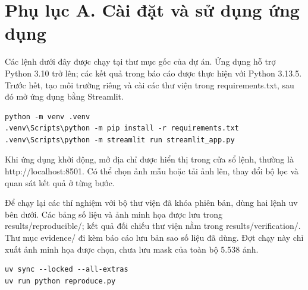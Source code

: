 \documentclass[12pt,a4paper]{extreport}
\begin{document}
\section*{Phụ lục A. Cài đặt và sử dụng ứng dụng}
Các lệnh dưới đây được chạy tại thư mục gốc của dự án. Ứng dụng hỗ trợ Python 3.10 trở lên; các kết quả trong báo cáo được thực hiện với Python 3.13.5. Trước hết, tạo môi trường riêng và cài các thư viện trong requirements.txt, sau đó mở ứng dụng bằng Streamlit.
\par
\begin{Verbatim}[fontsize=\fontsize{9}{10.3}\selectfont]
python -m venv .venv
.venv\Scripts\python -m pip install -r requirements.txt
.venv\Scripts\python -m streamlit run streamlit_app.py
\end{Verbatim}
Khi ứng dụng khởi động, mở địa chỉ được hiển thị trong cửa sổ lệnh, thường là http://localhost:8501. Có thể chọn ảnh mẫu hoặc tải ảnh lên, thay đổi bộ lọc và quan sát kết quả ở từng bước.
\par
Để chạy lại các thí nghiệm với bộ thư viện đã khóa phiên bản, dùng hai lệnh uv bên dưới. Các bảng số liệu và ảnh minh họa được lưu trong results/reproducible/; kết quả đối chiếu thư viện nằm trong results/verification/. Thư mục evidence/ đi kèm báo cáo lưu bản sao số liệu đã dùng. Đợt chạy này chỉ xuất ảnh minh họa được chọn, chưa lưu mask của toàn bộ 5.538 ảnh.
\par
\begin{Verbatim}[fontsize=\fontsize{9}{10.3}\selectfont]
uv sync --locked --all-extras
uv run python reproduce.py
\end{Verbatim}
\end{document}
